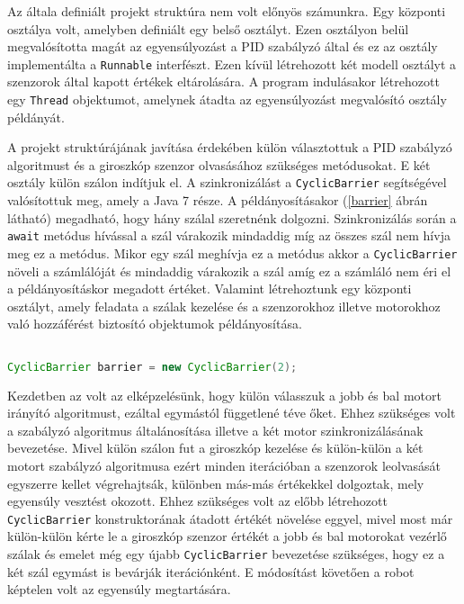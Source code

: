 Az általa definiált projekt struktúra nem volt előnyös számunkra. Egy központi osztálya volt, amelyben definiált egy belső osztályt. Ezen osztályon belül megvalósította magát az egyensúlyozást a PID szabályzó által és ez az osztály implementálta a \texttt{Runnable} interfészt. Ezen kívül létrehozott két modell osztályt a szenzorok által kapott értékek eltárolására. A program indulásakor létrehozott egy \texttt{Thread} objektumot, amelynek átadta az egyensúlyozást megvalósító osztály példányát. 

A projekt struktúrájának javítása érdekében külön választottuk a PID szabályzó algoritmust és a giroszkóp szenzor olvasásához szükséges metódusokat. E két osztály külön szálon indítjuk el. A szinkronizálást a \texttt{CyclicBarrier} segítségével valósítottuk meg, amely a Java 7 része. A példányosításakor (\ref{barrier} ábrán látható) megadható, hogy hány szálal szeretnénk dolgozni. Szinkronizálás során a \texttt{await} metódus hívással a szál várakozik mindaddig míg az összes szál nem hívja meg ez a metódus. Mikor egy szál meghívja ez a metódus akkor a \texttt{CyclicBarrier} növeli a számlálóját és mindaddig várakozik a szál amíg ez a számláló nem éri el a példányosításkor megadott értéket. Valamint létrehoztunk egy központi osztályt, amely feladata a szálak kezelése és a szenzorokhoz illetve motorokhoz való hozzáférést biztosító objektumok példányosítása.

\begin{lstlisting}[label=barrier, caption= CyclicBarrier példányosítása , language=Java]

CyclicBarrier barrier = new CyclicBarrier(2);

\end{lstlisting}

Kezdetben az volt az elképzelésünk, hogy külön válasszuk a jobb és bal motort irányító algoritmust, ezáltal egymástól függetlené téve őket. Ehhez szükséges volt a szabályzó algoritmus általánosítása illetve a két motor szinkronizálásának bevezetése. Mivel külön szálon fut a giroszkóp kezelése és külön-külön a két motort szabályzó algoritmusa ezért minden iterációban a szenzorok leolvasását egyszerre kellet végrehajtsák, különben más-más értékekkel dolgoztak, mely egyensúly vesztést okozott. Ehhez szükséges volt az előbb létrehozott \texttt{CyclicBarrier} konstruktorának átadott értékét növelése eggyel, mivel most már külön-külön kérte le a giroszkóp szenzor értékét a jobb és bal motorokat vezérlő szálak és emelet még egy újabb \texttt{CyclicBarrier} bevezetése szükséges, hogy ez a két szál egymást is bevárják iterációnként. E módosítást követően a robot képtelen volt az egyensúly megtartására.







 
